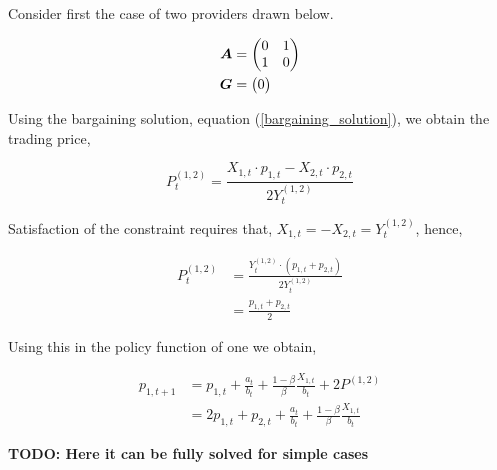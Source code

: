 Consider first the case of two providers drawn below.

\vspace{5mm}
\begin{minipage}{.5\textwidth}
    \resizebox{\textwidth}{!}{}
\end{minipage}
\begin{minipage}{.45\textwidth}
    \begin{equation*}
        \begin{split}
            \bm{A} &= \begin{pmatrix}
                0 & 1 \\
                1 & 0
            \end{pmatrix} \\
            \bm{G} &= \begin{pmatrix}
                0
            \end{pmatrix}
        \end{split}
    \end{equation*}
\end{minipage}
\vspace{5mm}

Using the bargaining solution, equation (\ref{bargaining_solution}), we obtain the trading price,

\begin{equation}
    P^{(1, 2)}_t = \frac{X_{1, t} \cdot p_{1, t} - X_{2, t} \cdot p_{2, t}}{2 Y^{(1, 2)}_t}
\end{equation}

Satisfaction of the constraint requires that, $X_{1, t} = - X_{2, t} = Y^{(1, 2)}_t$, hence,

\begin{equation}
    \begin{split}
        P^{(1, 2)}_t &= \frac{Y^{(1, 2)}_t \cdot \left( p_{1, t} + p_{2, t} \right)}{2  Y^{(1, 2)}_t} \\
        &= \frac{p_{1, t} + p_{2, t}}{2}
    \end{split}
\end{equation}

Using this in the policy function of one we obtain,

\begin{equation*}
    \begin{split}
        p_{1, t+1} &= p_{1, t} + \frac{a_t}{b_t} + \frac{1 - \beta}{\beta} \frac{X_{1, t}}{b_t} + 2P^{(1, 2)} \\
        &= 2p_{1, t} + p_{2, t} + \frac{a_t}{b_t} + \frac{1 - \beta}{\beta} \frac{X_{1, t}}{b_t}
    \end{split}
\end{equation*}

\textbf{TODO: Here it can be fully solved for simple cases}